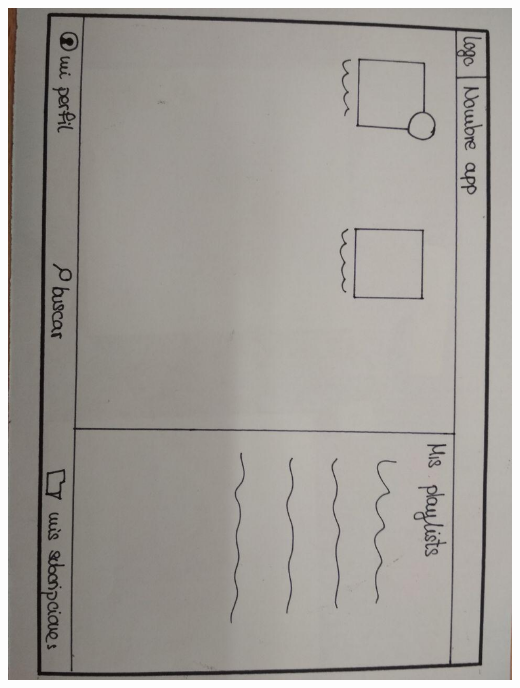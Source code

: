 \documentclass[a4paper]{article}
\begin{document}
\begin{center}
\includegraphics[width=0.7\columnwidth,angle=90]{Boceto7.jpg}
\end{center}
\end{document}
